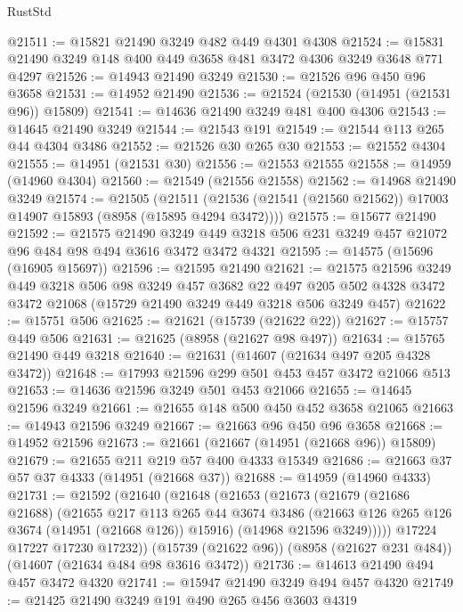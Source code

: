 \begin{lexlean}{RustStd}
\begin{coremodule}
@21511 := @15821 @21490 @3249 @482 @449 @4301 @4308
@21524 := @15831 @21490 @3249 @148 @400 @449 @3658 @481 @3472 @4306 @3249 @3648 @771 @4297
@21526 := @14943 @21490 @3249
@21530 := @21526 @96 @450 @96 @3658
@21531 := @14952 @21490
@21536 := @21524 (@21530 (@14951 (@21531 @96)) @15809)
@21541 := @14636 @21490 @3249 @481 @400 @4306
@21543 := @14645 @21490 @3249
@21544 := @21543 @191
@21549 := @21544 @113 @265 @44 @4304 @3486
@21552 := @21526 @30 @265 @30
@21553 := @21552 @4304
@21555 := @14951 (@21531 @30)
@21556 := @21553 @21555
@21558 := @14959 (@14960 @4304)
@21560 := @21549 (@21556 @21558)
@21562 := @14968 @21490 @3249
@21574 := @21505
    (@21511 (@21536 (@21541 (@21560 @21562)) @17003 @14907 @15893 (@8958 (@15895 @4294 @3472))))
@21575 := @15677 @21490
@21592 := @21575
    @21490
    @3249
    @449
    @3218
    @506
    @231
    @3249
    @457
    @21072
    @96
    @484
    @98
    @494
    @3616
    @3472
    @3472
    @4321
@21595 := @14575 (@15696 (@16905 @15697))
@21596 := @21595 @21490
@21621 := @21575
    @21596
    @3249
    @449
    @3218
    @506
    @98
    @3249
    @457
    @3682
    @22
    @497
    @205
    @502
    @4328
    @3472
    @3472
    @21068
    (@15729 @21490 @3249 @449 @3218 @506 @3249 @457)
@21622 := @15751 @506
@21625 := @21621 (@15739 (@21622 @22))
@21627 := @15757 @449 @506
@21631 := @21625 (@8958 (@21627 @98 @497))
@21634 := @15765 @21490 @449 @3218
@21640 := @21631 (@14607 (@21634 @497 @205 @4328 @3472))
@21648 := @17993 @21596 @299 @501 @453 @457 @3472 @21066 @513
@21653 := @14636 @21596 @3249 @501 @453 @21066
@21655 := @14645 @21596 @3249
@21661 := @21655 @148 @500 @450 @452 @3658 @21065
@21663 := @14943 @21596 @3249
@21667 := @21663 @96 @450 @96 @3658
@21668 := @14952 @21596
@21673 := @21661 (@21667 (@14951 (@21668 @96)) @15809)
@21679 := @21655 @211 @219 @57 @400 @4333 @15349
@21686 := @21663 @37 @57 @37 @4333 (@14951 (@21668 @37))
@21688 := @14959 (@14960 @4333)
@21731 := @21592
    (@21640
      (@21648
        (@21653
          (@21673
            (@21679
              (@21686 @21688)
              (@21655
                @217
                @113
                @265
                @44
                @3674
                @3486
                (@21663 @126 @265 @126 @3674 (@14951 (@21668 @126)) @15916)
                (@14968 @21596 @3249)))))
        @17224
        @17227
        @17230
        @17232))
    (@15739 (@21622 @96))
    (@8958 (@21627 @231 @484))
    (@14607 (@21634 @484 @98 @3616 @3472))
@21736 := @14613 @21490 @494 @457 @3472 @4320
@21741 := @15947 @21490 @3249 @494 @457 @4320
@21749 := @21425 @21490 @3249 @191 @490 @265 @456 @3603 @4319

\end{coremodule}
\end{lexlean}
